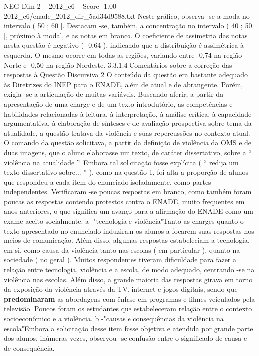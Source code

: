 \begin{textsample}{NEG Dim 2 – 2012\_c6 – Score -1.00 – 2012\_c6/enade\_2012\_dir\_5ad34d9588.txt}
Neste gráfico, observa -se a moda no intervalo ( 50 ; 60 ].
Destacam -se, também, a concentração no intervalo ( 40 ; 50 ], próximo à modal, e as notas em branco.
O coeficiente de assimetria das notas nesta questão é negativo ( -0,64 ), indicando que a distribuição é assimétrica à esquerda.
O mesmo ocorre em todas as regiões, variando entre -0,74 na região Norte e -0,50 na região Nordeste. 3.3.1.4 Comentários sobre a correção das respostas à Questão Discursiva 2 O conteúdo da questão era bastante adequado às Diretrizes do INEP para o ENADE, além de atual e de abrangente.
Porém, exigia -se a articulação de muitas variáveis.
Buscando aferir, a partir da apresentação de uma charge e de um texto introdutório, as competências e habilidades relacionadas à leitura, à interpretação, à análise crítica, à capacidade argumentativa, à elaboração de sínteses e de avaliação prospectiva sobre tema da atualidade, a questão tratava da violência e suas repercussões no contexto atual.
O comando da questão solicitava, a partir da definição de violência da OMS e de duas imagens, que o aluno elaborasse um texto, de caráter dissertativo, sobre a “ violência na atualidade ”.
Embora tal solicitação fosse explícita ( “ redija um texto dissertativo sobre... ” ), como na questão 1, foi alta a proporção de alunos que respondeu a cada item do enunciado isoladamente, como partes independentes.
Verificaram -se poucas respostas em branco, como também foram poucas as respostas contendo protestos contra o ENADE, muito frequentes em anos anteriores, o que significa um avanço para a afirmação do ENADE como um exame aceito socialmente. a -"tecnologia e violência"Tanto as charges quanto o texto apresentado no enunciado induziram os alunos a focarem suas respostas nos meios de comunicação.
Além disso, algumas respostas estabeleciam a tecnologia, em si, como causa da violência tanto nas escolas ( em particular ), quanto na sociedade ( no geral ).
Muitos respondentes tiveram dificuldade para fazer a relação entre tecnologia, violência e a escola, de modo adequado, centrando -se na violência nas escolas.
Além disso, a grande maioria das respostas girava em torno da exposição da violência através da TV, internet e jogos digitais, sendo que \textbf{predominaram} as abordagens com ênfase em programas e filmes veiculados pela televisão.
Poucos foram os estudantes que estabeleceram relação entre o contexto socioeconômico e a violência. b -"causas e consequências da violência na escola"Embora a solicitação desse item fosse objetiva e atendida por grande parte dos alunos, inúmeras vezes, observou -se confusão entre o significado de causa e de consequência.

\end{textsample}
